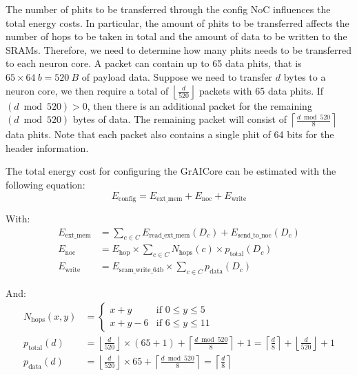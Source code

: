 The number of phits to be transferred through the config NoC influences the total energy costs.
In particular, the amount of phits to be transferred affects the number of hops to be taken in total and the amount of data to be written to the SRAMs.
Therefore, we need to determine how many phits needs to be transferred to each neuron core.
A packet can contain up to 65 data phits, that is $65 \times \SI{64}{b} = \SI{520}{B}$ of payload data.
Suppose we need to transfer $d$ bytes to a neuron core, we then require a total of $\left\lfloor \frac{d}{520} \right\rfloor$ packets with 65 data phits.
If $\left( d \bmod 520 \right) > 0$, then there is an additional packet for the remaining $\left( d \bmod 520 \right)$ bytes of data.
The remaining packet will consist of $\left\lceil \frac{d \bmod 520}{8}\right\rceil$ data phits.
Note that each packet also contains a single phit of 64 bits for the header information.


The total energy cost for configuring the GrAICore can be estimated with the following equation:
\begin{equation}
    E_{\textrm{config}} = E_{\textrm{ext\_mem}} + E_{\textrm{noc}} + E_{\textrm{write}}
\end{equation}

With:
\begin{align*} 
E_{\textrm{ext\_mem}} &= 
        \sum_{c \in C}^{}{E_\textrm{read\_ext\_mem}(D_c) + E_{\textrm{send\_to\_noc}}(D_c)} \\
E_{\textrm{noc}} &=
    E_{\textrm{hop}} \times \sum_{c \in C}^{}{N_\textrm{hops}(c) \times p_{\textrm{total}}(D_c)} \\
E_{\textrm{write}} &=
    E_{\textrm{sram\_write\_64b}} \times \sum_{c \in C}^{}{p_{\textrm{data}}(D_c)}
\end{align*}

And:
\begin{align*} 
N_{\textrm{hops}}(x,y) &=
    \begin{cases} 
        x + y & \textrm{if } 0 \leq y \leq 5 \\
        x + y - 6 & \text{if } 6 \leq y \leq 11
    \end{cases}
\\
p_{\textrm{total}}(d) &=
    \left\lfloor \frac{d}{520} \right\rfloor \times (65 + 1) + \left\lceil \frac{d \bmod 520}{8} \right\rceil + 1 =
    \left\lceil \frac{d}{8} \right\rceil + \left\lfloor \frac{d}{520} \right\rfloor + 1 
\\
p_{\textrm{data}}(d) &=
    \left\lfloor \frac{d}{520} \right\rfloor \times 65 + \left\lceil \frac{d \bmod 520}{8} \right\rceil =
    \left\lceil \frac{d}{8} \right\rceil
\end{align*}

